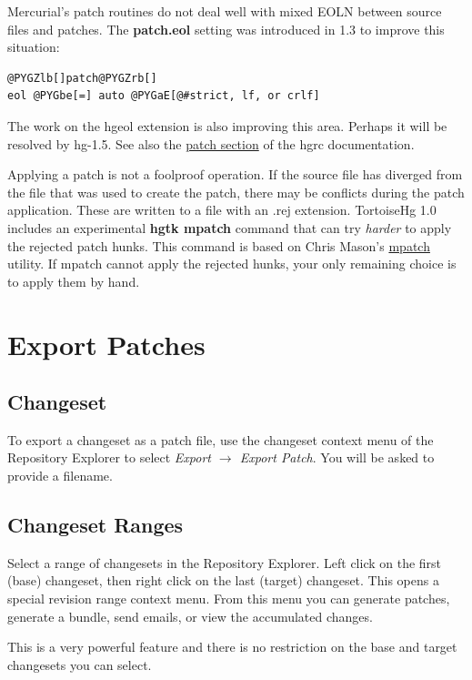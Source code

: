 \documentclass[letterpaper,10pt,english]{manual}
\begin{document}
Mercurial's patch routines do not deal well with mixed EOLN between
source files and patches.  The \textbf{patch.eol} setting was introduced in
1.3 to improve this situation:

\begin{Verbatim}[commandchars=@\[\]]
@PYGZlb[]patch@PYGZrb[]
eol @PYGbe[=] auto @PYGaE[@#strict, lf, or crlf]
\end{Verbatim}

The work on the hgeol extension is also improving this area.  Perhaps it
will be resolved by hg-1.5.  See also the
\href{http://www.selenic.com/mercurial/hgrc.5.html\#patch}{patch section}
of the hgrc documentation.

Applying a patch is not a foolproof operation.  If the source file has
diverged from the file that was used to create the patch, there may be
conflicts during the patch application.  These are written to a file
with an .rej extension.  TortoiseHg 1.0 includes an experimental
\textbf{hgtk mpatch} command that can try \emph{harder} to apply the
rejected patch hunks.  This command is based on Chris Mason's \href{http://oss.oracle.com/~mason/mpatch/}{mpatch} utility.  If mpatch cannot
apply the rejected hunks, your only remaining choice is to apply them by
hand.


\section{Export Patches}


\subsection{Changeset}

To export a changeset as a patch file, use the changeset context menu of
the Repository Explorer to select \emph{Export \(\rightarrow\) Export Patch}.
You will be asked to provide a filename.


\subsection{Changeset Ranges}

Select a range of changesets in the Repository Explorer.  Left click on
the first (base) changeset, then right click on the last (target)
changeset.  This opens a special revision range context menu.  From this
menu you can generate patches, generate a bundle, send emails, or view
the accumulated changes.

This is a very powerful feature and there is no restriction on the base
and target changesets you can select.
\end{document}
